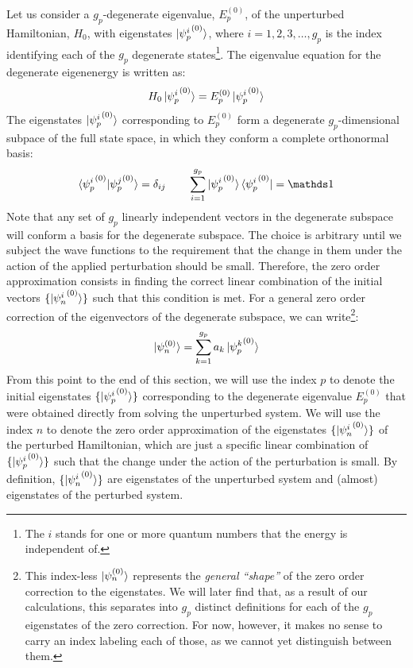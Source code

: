 Let us consider a $g_p$-degenerate eigenvalue, $E_p^{(0)}$, of the unperturbed Hamiltonian, $H_0$, with eigenstates $\ket{{\psi_p^i}^{(0)}}$, where $i = 1, 2, 3, \dots , g_p$ is the index identifying each of the $g_p$ degenerate states\footnote{The $i$ stands for one or more quantum numbers that the energy is independent of.}. The eigenvalue equation for the degenerate eigenenergy is written as:
\begin{equation}
    H_0 \ket{{\psi_p^i}^{(0)}} = E_p^{(0)} \ket{{\psi_p^i}^{(0)}}
\end{equation}
The eigenstates $\ket{{\psi_p^i}^{(0)}}$ corresponding to $E_p^{(0)}$ form a degenerate $g_p$-dimensional subpace of the full state space, in which they conform a complete orthonormal basis:
\begin{equation}
    \braket{{\psi_p^i}^{(0)}|{\psi_p^j}^{(0)}} = \delta_{ij} \qquad \sum_{i=1}^{g_p} \ket{{\psi_p^i}^{(0)}}\bra{{\psi_p^i}^{(0)}} = \Imat
\end{equation}
Note that any set of $g_p$ linearly independent vectors in the degenerate subspace will conform a basis for the degenerate subspace. The choice is arbitrary until we subject the wave functions to the requirement that the change in them under the action of the applied perturbation should be small. Therefore, the zero order approximation consists in finding the correct linear combination of the initial vectors $\{\ket{{\psi_n^i}^{(0)}}\}$ such that this condition is met. For a general zero order correction of the eigenvectors of the degenerate subspace, we can write\footnote{This index-less $\ket{\psi_n^{(0)}}$ represents the \textit{general ``shape''} of the zero order correction to the eigenstates. We will later find that, as a result of our calculations, this separates into $g_p$ distinct definitions for each of the $g_p$ eigenstates of the zero correction. For now, however, it makes no sense to carry an index labeling each of those, as we cannot yet distinguish between them.}:
\begin{equation} \label{zero_order_approx_initial_def}
    \ket{\psi_n^{(0)}} = \sum_{k=1}^{g_p} a_k\ket{{\psi_p^k}^{(0)}}
\end{equation}
From this point to the end of this section, we will use the index $p$ to denote the initial eigenstates $\{\ket{{\psi_p^i}^{(0)}}\}$ corresponding to the degenerate eigenvalue $E_p^{(0)}$ that were obtained directly from solving the unperturbed system. We will use the index $n$ to denote the zero order approximation of the eigenstates $\{\ket{{\psi_n^i}^{(0)}}\}$ of the perturbed Hamiltonian, which are just a specific linear combination of $\{\ket{{\psi_p^i}^{(0)}}\}$ such that the change under the action of the perturbation is small. By definition, $\{\ket{{\psi_n^i}^{(0)}}\}$ are eigenstates of the unperturbed system and (almost) eigenstates of the perturbed system. %

